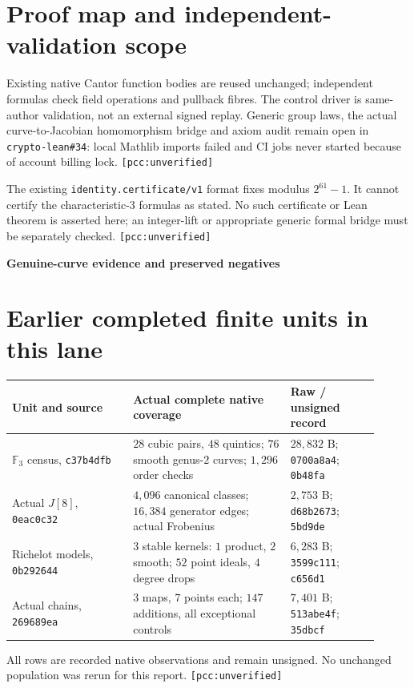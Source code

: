 \documentclass[10pt,a4paper]{article}
\newcommand{\uv}{\texttt{[pcc:unverified]}}
\begin{document}
\section{Proof map and independent-validation scope}
Existing native Cantor function bodies are reused unchanged; independent
formulas check field operations and pullback fibres. The control driver is
same-author validation, not an external signed replay. Generic group laws,
the actual curve-to-Jacobian homomorphism bridge and axiom audit remain
open in \texttt{crypto-lean\#34}: local Mathlib imports failed and CI jobs
never started because of account billing lock. \uv

The existing \texttt{identity.certificate/v1} format fixes modulus
$2^{61}-1$. It cannot certify the characteristic-$3$ formulas as stated.
No such certificate or Lean theorem is asserted here; an integer-lift or
appropriate generic formal bridge must be separately checked. \uv

\newpage
{\Large\bfseries Genuine-curve evidence and preserved negatives}\par

\section{Earlier completed finite units in this lane}
\begin{center}\begin{tabular}{@{}L{0.30\linewidth}L{0.39\linewidth}L{0.22\linewidth}@{}}
\toprule
Unit and source & Actual complete native coverage & Raw / unsigned record\\\midrule
$\mathbb F_3$ census, \texttt{c37b4dfb} & $28$ cubic pairs, $48$ quintics;
$76$ smooth genus-$2$ curves; $1{,}296$ order checks & $28{,}832$ B;
\texttt{0700a8a4}; \texttt{0b48fa}\\
Actual $J[8]$, \texttt{0eac0c32} & $4{,}096$ canonical classes;
$16{,}384$ generator edges; actual Frobenius & $2{,}753$ B;
\texttt{d68b2673}; \texttt{5bd9de}\\
Richelot models, \texttt{0b292644} & $3$ stable kernels: $1$ product,
$2$ smooth; $52$ point ideals, $4$ degree drops & $6{,}283$ B;
\texttt{3599c111}; \texttt{c656d1}\\
Actual chains, \texttt{269689ea} & $3$ maps, $7$ points each;
$147$ additions, all exceptional controls & $7{,}401$ B;
\texttt{513abe4f}; \texttt{35dbcf}\\
\bottomrule\end{tabular}\end{center}
All rows are recorded native observations and remain unsigned. No unchanged
population was rerun for this report. \uv
\end{document}
